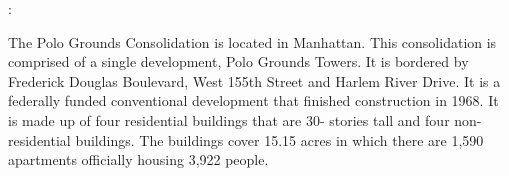 :     

   

The Polo Grounds Consolidation is located in Manhattan. This consolidation is comprised of a single development, Polo Grounds Towers. It is bordered by Frederick Douglas Boulevard, West 155th Street and Harlem River Drive. It is a federally funded conventional development that finished construction in 1968. It is made up of four residential buildings that are 30- stories tall and four non-residential buildings. The buildings cover 15.15 acres in which there are 1,590 apartments officially housing 3,922 people. 